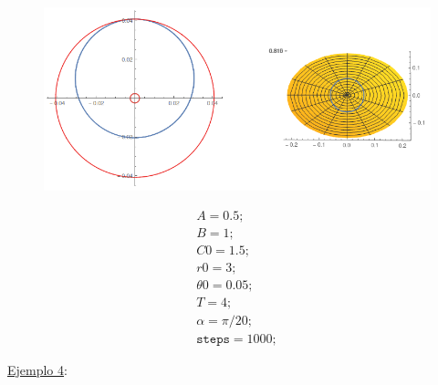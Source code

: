 \documentclass[a4paper,10pt]{article}
\numberwithin{equation}{section}
\begin{document}
\begin{multicols}{2}

\begin{figure}[H]
\center
\includegraphics[scale=0.35]{problema5fig4}
\label{fig:problema5fig4}
\end{figure}

\begin{equation*}
\begin{aligned}
 A = 0.5; \\
 B = 1; \\
 C0 = 1.5; \\ 
 r0 = 3; \\
 \theta 0 = 0.05; \\
 T = 4; \\
 \alpha = \pi/20; \\ 
 \texttt{steps} = 1000;
\end{aligned}
\end{equation*}

\end{multicols}

\newpage

\underline{Ejemplo 4}:
\end{document}
